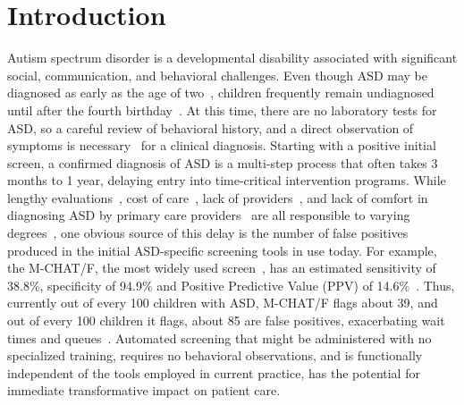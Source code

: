 \documentclass[3p,super,numbers,sort&compress,preprint,10pt]{elsarticle}
\begin{document}
  \section*{Introduction}
 Autism spectrum disorder is a developmental disability associated with significant social, communication, and behavioral challenges.
Even though ASD may be diagnosed as early as the  age of two~\cite{cdc},  children frequently remain undiagnosed  until after the fourth birthday~\cite{pmid24529515}. At this
time, there are no laboratory tests for ASD, so a careful review of behavioral history, and a direct
observation of symptoms is
necessary~\cite{volkmar2014practice,hyman2020identification} for a clinical diagnosis.  Starting with a positive initial screen, a confirmed diagnosis of ASD is a   multi-step process that often takes 3 months to 1 year,  delaying entry into time-critical intervention programs. While   lengthy evaluations~\cite{kalb2012determinants}, cost of care~\cite{bisgaier2011access},  lack of providers~\cite{fenikile2015barriers}, and lack of comfort in diagnosing ASD by primary care providers~\cite{fenikile2015barriers} are all responsible to varying degrees~\cite{gordon2016whittling}, one  obvious source of this delay is the number of false positives produced in the initial ASD-specific screening tools in use today. For example, the  M-CHAT/F, the most widely used screen~\cite{robins2014validation,hyman2020identification},  has an estimated  sensitivity of 38.8\%, specificity of 94.9\% and Positive Predictive Value (PPV) of 14.6\%~\cite{pmid31562252}. Thus,  currently  out of every 100 children with ASD,  M-CHAT/F flags about 39, and out of every 100 children it flags, about 85 are false positives, exacerbating  wait times and queues~\cite{gordon2016whittling}.  Automated   screening  that might be administered with  no specialized training, requires no behavioral observations, and is functionally independent of the tools employed in current practice,  has the potential for  immediate transformative  impact on patient care.
\end{document}
